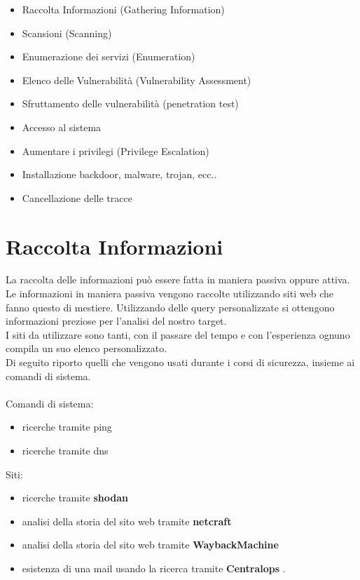 \documentclass[a4paper,12pt]{article}
\begin{document}
\begin{itemize}
    \item Raccolta Informazioni (Gathering Information)
    \item Scansioni (Scanning)
    \item Enumerazione  dei servizi (Enumeration)
    \item Elenco delle Vulnerabilità (Vulnerability Assessment)
    \item Sfruttamento delle vulnerabilità (penetration test)
    \item Accesso al sistema
    \item Aumentare i privilegi (Privilege Escalation)
    \item Installazione backdoor, malware, trojan, ecc..
    \item Cancellazione delle tracce

\end{itemize}

\section{Raccolta Informazioni}

La raccolta delle informazioni può essere fatta in maniera passiva oppure attiva. 
Le informazioni in maniera passiva vengono raccolte utilizzando siti web che fanno questo di mestiere. Utilizzando delle query personalizzate si ottengono informazioni preziose per l'analisi del nostro target. \\
I siti da utilizzare sono tanti, con il passare del tempo e con l'esperienza ognuno compila un suo elenco personalizzato. \\ Di seguito riporto quelli che vengono usati durante i corsi di sicurezza, insieme ai comandi di sistema.\\ 
\\
Comandi di sistema:

\begin{itemize}
    \item ricerche tramite ping 
    \item ricerche tramite dns
\end{itemize}
Siti:
\begin{itemize}
    \item ricerche tramite \textbf{shodan} \cite{shodan}
    \item analisi della storia del sito web tramite \textbf{netcraft} \cite{netcraft}
    \item analisi della storia del sito web tramite \textbf{WaybackMachine} \cite{wayback}
    \item esistenza di una mail usando la ricerca tramite \textbf{Centralops} \cite{centralops}.
\end{itemize}
\end{document}
